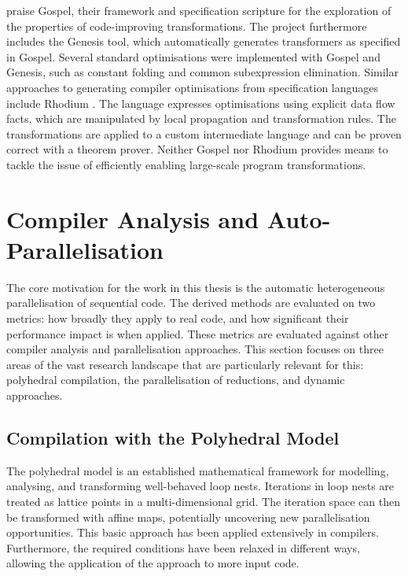     \citet{Whitfield:1997:AEC:267959.267960} praise Gospel, their framework and
    specification scripture for the exploration of the properties of
    code-improving transformations.
    The project furthermore includes the Genesis tool, which automatically
    generates transformers as specified in Gospel.
    Several standard optimisations were implemented with Gospel and Genesis,
    such as constant folding and common subexpression elimination.
    Similar approaches to generating compiler optimisations from specification
    languages include Rhodium \citep{Lerner:2005:ASP:1040305.1040335}.
    The language expresses optimisations using explicit data flow facts, which
    are manipulated by local propagation and transformation rules.
    The transformations are applied to a custom intermediate language and can
    be proven correct with a theorem prover.
    Neither Gospel nor Rhodium provides means to tackle the issue of efficiently
    enabling large-scale program transformations.

\section{Compiler Analysis and Auto-Parallelisation}

    The core motivation for the work in this thesis is the automatic
    heterogeneous parallelisation of sequential code.
    The derived methods are evaluated on two metrics: how broadly they apply to
    real code, and how significant their performance impact is when applied.
    These metrics are evaluated against other compiler analysis and
    parallelisation approaches.
    This section focuses on three areas of the vast research landscape
    that are particularly relevant for this: polyhedral compilation, the
    parallelisation of reductions, and dynamic approaches.

\subsection{Compilation with the Polyhedral Model}

    The polyhedral model \citep{Karp:1967:OCU:321406.321418} is an established
    mathematical framework for modelling, analysing, and transforming
    well-behaved loop nests.
    Iterations in loop nests are treated as lattice points in a
    multi-dimensional grid.
    The iteration space can then be transformed with affine maps, potentially
    uncovering new parallelisation opportunities.
    This basic approach has been applied extensively in compilers.
    Furthermore, the required conditions have been relaxed in different ways,
    allowing the application of the approach to more input code.


